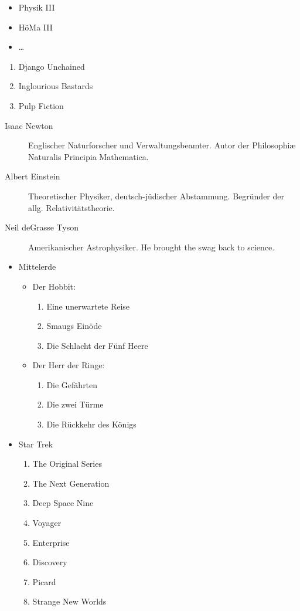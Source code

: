 \documentclass{scrartcl}
\begin{document}
\begin{itemize}
  \item Physik III
  \item HöMa III
  \item …
\end{itemize}

\begin{enumerate}
  \item Django Unchained
  \item Inglourious Bastards
  \item Pulp Fiction
\end{enumerate}

\begin{description}
  \item[Isaac Newton] Englischer Naturforscher und Verwaltungsbeamter.
    Autor der Philosophiæ Naturalis Principia Mathematica.
  \item[Albert Einstein] Theoretischer Physiker, deutsch-jüdischer Abstammung.
    Begründer der allg. Relativitätstheorie.
  \item[Neil deGrasse Tyson] Amerikanischer Astrophysiker.
    He brought the swag back to science.
\end{description}

\begin{itemize}
  \item Mittelerde
    \begin{itemize}
      \item Der Hobbit:
        \begin{enumerate}
          \item Eine unerwartete Reise
          \item Smaugs Einöde
          \item Die Schlacht der Fünf Heere
        \end{enumerate}
      \item Der Herr der Ringe:
        \begin{enumerate}
          \item Die Gefährten
          \item Die zwei Türme
          \item Die Rückkehr des Königs
        \end{enumerate}
    \end{itemize}
  \item Star Trek
    \begin{enumerate}
      \item The Original Series
      \item The Next Generation
      \item Deep Space Nine
      \item Voyager
      \item Enterprise
      \item Discovery
      \item Picard
      \item Strange New Worlds
    \end{enumerate}
\end{itemize}
\end{document}
